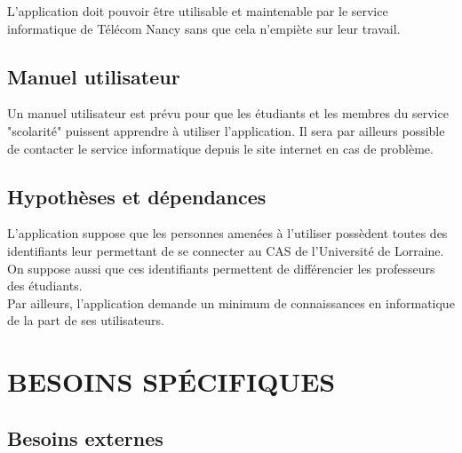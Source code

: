 \documentclass{scrreprt}
\begin{document}
\hspace{0.6cm}L'application doit pouvoir être utilisable et maintenable par le service informatique de Télécom Nancy sans que cela n'empiète sur leur travail.


\section{Manuel utilisateur}
\hspace{1cm}Un manuel utilisateur est prévu pour que les étudiants et les membres du service "scolarité" puissent apprendre à utiliser l'application. Il sera par ailleurs possible de contacter le service informatique depuis le site internet en cas de problème.


\section{Hypothèses et dépendances}
\hspace{1cm}L'application suppose que les personnes amenées à l'utiliser possèdent toutes des identifiants leur permettant de se connecter au CAS de l'Université de Lorraine. On suppose aussi que ces identifiants permettent de différencier les professeurs des étudiants.\\

\hspace{0,70cm}Par ailleurs, l'application demande un minimum de connaissances en informatique de la part de ses utilisateurs.


\chapter{BESOINS SPÉCIFIQUES}

\section{Besoins externes}
\end{document}
